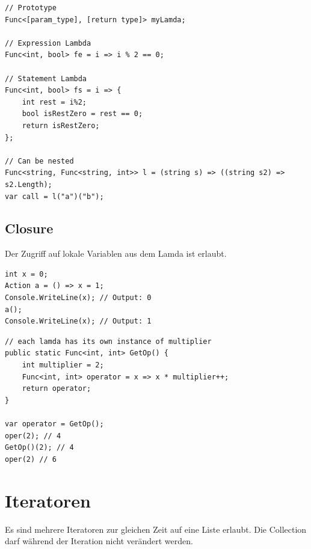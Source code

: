 \documentclass[
a4paper,
oneside,
10pt,
fleqn,
headsepline,
toc=listofnumbered, 
bibliography=totocnumbered]{scrartcl}
\let\stdsection\section
\renewcommand\section{\clearpage\stdsection}
\begin{document}
\begin{lstlisting}
// Prototype
Func<[param_type], [return type]> myLamda;

// Expression Lambda
Func<int, bool> fe = i => i % 2 == 0;

// Statement Lambda
Func<int, bool> fs = i => {
	int rest = i%2;
	bool isRestZero = rest == 0;
	return isRestZero;
};

// Can be nested
Func<string, Func<string, int>> l = (string s) => ((string s2) => s2.Length);
var call = l("a")("b");
\end{lstlisting}

\subsection{Closure}
Der Zugriff auf lokale Variablen aus dem Lamda ist erlaubt. 
\begin{lstlisting}
int x = 0;
Action a = () => x = 1;
Console.WriteLine(x); // Output: 0
a();
Console.WriteLine(x); // Output: 1
\end{lstlisting}

\begin{lstlisting}
// each lamda has its own instance of multiplier
public static Func<int, int> GetOp() {
	int multiplier = 2;
	Func<int, int> operator = x => x * multiplier++;
	return operator;
}

var operator = GetOp();
oper(2); // 4
GetOp()(2); // 4
oper(2) // 6
\end{lstlisting}


\section{Iteratoren}
Es sind mehrere Iteratoren zur gleichen Zeit auf eine Liste erlaubt. Die Collection darf während der Iteration nicht verändert werden. 
\end{document}

